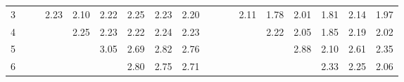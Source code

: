 \documentclass[a4paper, 10pt, ngerman]{article}
\begin{document}
\begin{figure}
\begin{tabular}{c|p{\colwidth}p{\colwidth}p{\colwidth}p{\colwidth}p{\colwidth}p{\colwidth}p{\colwidth}p{\colwidth}c|p{\colwidth}p{\colwidth}p{\colwidth}p{\colwidth}p{\colwidth}p{\colwidth}p{\colwidth}p{\colwidth}}
            3 &                                    &                                    & \textcolor[HTML]{ 90206e }{ 2.23 } & \textcolor[HTML]{ 81207d }{ 2.10 } & \textcolor[HTML]{ 90206e }{ 2.22 } & \textcolor[HTML]{ 93206b }{ 2.25 } & \textcolor[HTML]{ 91206d }{ 2.23 } & \textcolor[HTML]{ 8d2071 }{ 2.20 } & \space &                                    &                                    & \textcolor[HTML]{ 752089 }{ 2.11 } & \textcolor[HTML]{ 5220ac }{ 1.78 } & \textcolor[HTML]{ 6a2094 }{ 2.01 } & \textcolor[HTML]{ 5620a8 }{ 1.81 } & \textcolor[HTML]{ 772087 }{ 2.14 } & \textcolor[HTML]{ 662098 }{ 1.97 } \\
            4 &                                    &                                    &                                    & \textcolor[HTML]{ 93206b }{ 2.25 } & \textcolor[HTML]{ 91206d }{ 2.23 } & \textcolor[HTML]{ 90206e }{ 2.22 } & \textcolor[HTML]{ 92206c }{ 2.24 } & \textcolor[HTML]{ 90206e }{ 2.23 } & \space &                                    &                                    &                                    & \textcolor[HTML]{ 80207e }{ 2.22 } & \textcolor[HTML]{ 6f208f }{ 2.05 } & \textcolor[HTML]{ 5920a5 }{ 1.85 } & \textcolor[HTML]{ 7d2081 }{ 2.19 } & \textcolor[HTML]{ 6b2093 }{ 2.02 } \\
            5 &                                    &                                    &                                    &                                    & \textcolor[HTML]{ f1200d }{ 3.05 } & \textcolor[HTML]{ c62038 }{ 2.69 } & \textcolor[HTML]{ d62028 }{ 2.82 } & \textcolor[HTML]{ ce2030 }{ 2.76 } & \space &                                    &                                    &                                    &                                    & \textcolor[HTML]{ c62038 }{ 2.88 } & \textcolor[HTML]{ 74208a }{ 2.10 } & \textcolor[HTML]{ a92055 }{ 2.61 } & \textcolor[HTML]{ 8e2070 }{ 2.35 } \\
            6 &                                    &                                    &                                    &                                    &                                    & \textcolor[HTML]{ d3202b }{ 2.80 } & \textcolor[HTML]{ cd2031 }{ 2.75 } & \textcolor[HTML]{ c92035 }{ 2.71 } & \space &                                    &                                    &                                    &                                    &                                    & \textcolor[HTML]{ 8c2072 }{ 2.33 } & \textcolor[HTML]{ 83207b }{ 2.25 } & \textcolor[HTML]{ 70208e }{ 2.06 } \\

\end{tabular}
\end{figure}
\end{document}
